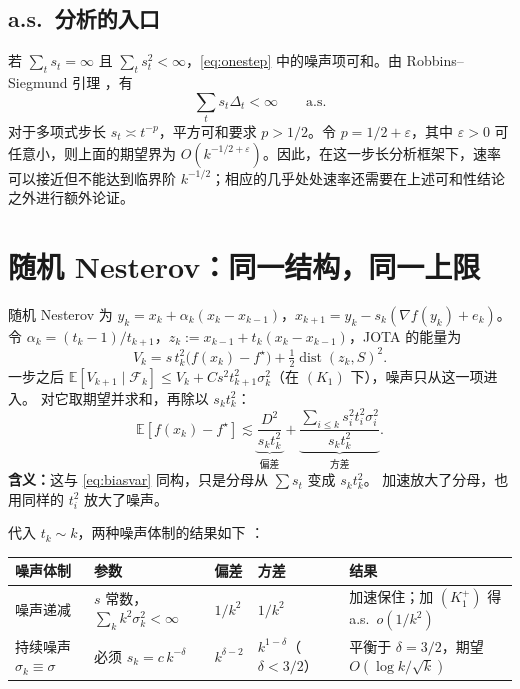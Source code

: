 \documentclass[11pt]{ctexart}
\newcommand{\E}{\mathbb{E}}
\newcommand{\F}{\mathcal{F}}
\newcommand{\dist}{\operatorname{dist}}
\begin{document}
\subsection{a.s.\ 分析的入口}

若 $\sum_t s_t=\infty$ 且 $\sum_t s_t^2<\infty$，\eqref{eq:onestep} 中的噪声项可和。由 Robbins--Siegmund 引理 \citep{robbins1971}，有
\[
\sum_t s_t\Delta_t<\infty \qquad \text{a.s.}
\]
对于多项式步长 $s_t\asymp t^{-p}$，平方可和要求 $p>1/2$。令 $p=1/2+\varepsilon$，其中 $\varepsilon>0$ 可任意小，则上面的期望界为 $O(k^{-1/2+\varepsilon})$。因此，在这一步长分析框架下，速率可以接近但不能达到临界阶 $k^{-1/2}$；相应的几乎处处速率还需要在上述可和性结论之外进行额外论证。

\section{随机 Nesterov：同一结构，同一上限}

随机 Nesterov 为
$y_k=x_k+\alpha_k(x_k-x_{k-1})$，$x_{k+1}=y_k-s_k(\nabla f(y_k)+e_k)$。
令 $\alpha_k=(t_k-1)/t_{k+1}$，$z_k:=x_{k-1}+t_k(x_k-x_{k-1})$，JOTA 的能量为
\[
V_k=s\,t_k^2\bigl(f(x_k)-f^\star\bigr)+\tfrac12\dist(z_k,S)^2 .
\]
一步之后 $\E[V_{k+1}\mid\F_k]\le V_k+Cs^2t_{k+1}^2\sigma_k^2$（在 $(K_1)$ 下），噪声只从这一项进入。
对它取期望并求和，再除以 $s_kt_k^2$：
\[
\E[f(x_k)-f^\star]
\lesssim
\underbrace{\frac{D^2}{s_kt_k^2}}_{\text{偏差}}
+\underbrace{\frac{\sum_{i\le k}s_i^2t_i^2\sigma_i^2}{s_kt_k^2}}_{\text{方差}} .
\]
\textbf{含义：}这与 \eqref{eq:biasvar} 同构，只是分母从 $\sum s_t$ 变成 $s_kt_k^2$。
加速放大了分母，也用同样的 $t_i^2$ 放大了噪声。

代入 $t_k\sim k$，两种噪声体制的结果如下 \citep[Remark~3.1--3.2]{attouch2026ravine}：

\begin{center}
\small
\begin{tabularx}{\linewidth}{@{}lYllY@{}}
\toprule
噪声体制 & 参数 & 偏差 & 方差 & 结果 \\
\midrule
噪声递减 & $s$ 常数，$\sum_k k^2\sigma_k^2<\infty$ & $1/k^2$ & $1/k^2$ & 加速保住；加 $(K_1^+)$ 得 a.s.\ $o(1/k^2)$ \\
持续噪声 $\sigma_k\equiv\sigma$ & 必须 $s_k=c\,k^{-\delta}$ & $k^{\delta-2}$ & $k^{1-\delta}$（$\delta<3/2$） & 平衡于 $\delta=3/2$，期望 $O(\log k/\sqrt k)$ \\
\bottomrule
\end{tabularx}
\end{center}
\end{document}

